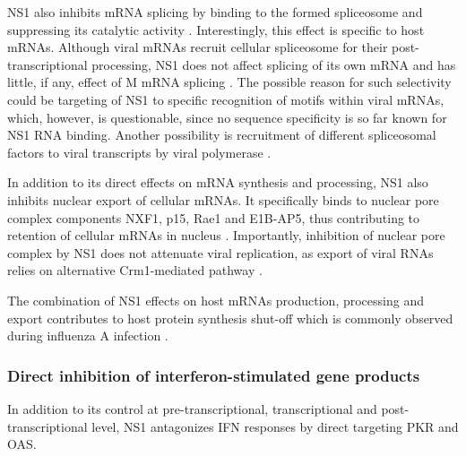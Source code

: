 		NS1 also inhibits mRNA splicing by binding to the formed spliceosome and suppressing its catalytic activity \parencite{Lu1994, Qiu1995}. Interestingly, this effect is specific to host mRNAs. Although viral mRNAs recruit cellular spliceosome for their post-transcriptional processing, NS1 does not affect splicing of its own mRNA \parencite{Robb2010} and has little, if any, effect of M mRNA splicing \parencite{Salvatore2002, Robb2012}. The possible reason for such selectivity could be targeting of NS1 to specific recognition of motifs within viral mRNAs, which, however, is questionable, since no sequence specificity is so far known for NS1 RNA binding. Another possibility is recruitment of different spliceosomal factors to viral transcripts by viral polymerase \parencite{Fournier2014}.
		
		In addition to its direct effects on mRNA synthesis and processing, NS1 also inhibits nuclear export of cellular mRNAs. It specifically binds to nuclear pore complex components NXF1, p15, Rae1 and E1B-AP5, thus contributing to retention of cellular mRNAs in nucleus \parencite{Satterly2007}. Importantly, inhibition of nuclear pore complex by NS1 does not attenuate viral replication, as export of viral RNAs relies on alternative Crm1-mediated pathway \parencite{Neumann2000}.
		
		The combination of NS1 effects on host mRNAs production, processing and export contributes to host protein synthesis shut-off which is commonly observed during influenza A infection \parencite{Beloso1992}.
		
		\subsubsection{Direct inhibition of interferon-stimulated gene products}
		
		In addition to its control at pre-transcriptional, transcriptional and post-transcriptional level, NS1 antagonizes \gls{IFN} responses by direct targeting \gls{PKR} and \gls{OAS}. 
		

